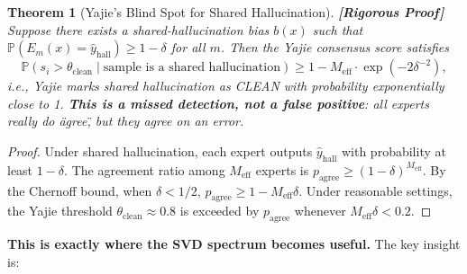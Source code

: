 \documentclass[12pt,a4paper]{article}
\newtheorem{theorem}{Theorem}[section]
\theoremstyle{remark}
\newcommand{\Pbb}{\mathbb{P}}
\newcommand{\rigorFull}{\textnormal{\textbf{[Rigorous Proof]}}}
\begin{document}
\begin{theorem}[Yajie's Blind Spot for Shared Hallucination]\label{thm:yajie_blind}\rigorFull
Suppose there exists a shared-hallucination bias $b(x)$ such that $\Pbb(E_m(x) = \hat{y}_{\text{hall}}) \geq 1 - \delta$ for all $m$. Then the Yajie consensus score satisfies
\begin{equation}
    \Pbb(s_i > \theta_{\text{clean}} \mid \text{sample is a shared hallucination}) \geq 1 - M_{\text{eff}} \cdot \exp(-2\delta^{-2}),
\end{equation}
i.e., Yajie marks shared hallucination as CLEAN with probability exponentially close to 1. \textbf{This is a missed detection, not a false positive}: all experts really do \"agree\", but they agree on an error.
\end{theorem}

\begin{proof}
Under shared hallucination, each expert outputs $\hat{y}_{\text{hall}}$ with probability at least $1-\delta$. The agreement ratio among $M_{\text{eff}}$ experts is $p_{\text{agree}} \geq (1 - \delta)^{M_{\text{eff}}}$. By the Chernoff bound, when $\delta < 1/2$, $p_{\text{agree}} \geq 1 - M_{\text{eff}}\delta$. Under reasonable settings, the Yajie threshold $\theta_{\text{clean}} \approx 0.8$ is exceeded by $p_{\text{agree}}$ whenever $M_{\text{eff}}\delta < 0.2$.
\end{proof}

\textbf{This is exactly where the SVD spectrum becomes useful.} The key insight is:

\begin{center}
\end{center}
\end{document}
